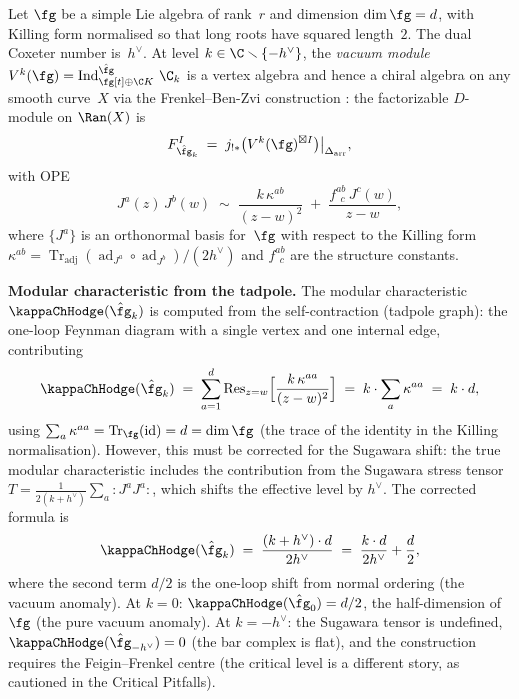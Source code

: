\begin{example}
\label{ex:affine-KM-SC}

Let $\fg$ be a simple Lie algebra of rank~$r$ and dimension
$\dim\fg = d$, with Killing form normalised so that long roots
have squared length~$2$. The dual Coxeter number is~$h^\vee$.
At level $k \in \C \smallsetminus \{-h^\vee\}$, the
\emph{vacuum module} $V^k(\fg) = \operatorname{Ind}_{\fg[t] \oplus
\C K}^{\hat\fg}\, \C_k$ is a vertex algebra and hence a chiral
algebra on any smooth curve~$X$ via the Frenkel--Ben-Zvi
construction \cite{FBZ04}: the factorizable $D$-module on $\Ran(X)$ is
\begin{equation}\label{eq:affine-fact-dmod}
 F_{\hat\fg_k}^I
 \;=\;
 j_{!*}\bigl(V^k(\fg)^{\boxtimes I}\bigr)
 \big|_{\Delta_{\mathrm{arr}}},
\end{equation}
with OPE
\begin{equation}\label{eq:affine-OPE}
 J^a(z)\, J^b(w)
 \;\sim\;
 \frac{k\,\kappa^{ab}}{(z-w)^2}
 \;+\;
 \frac{f^{ab}_{\ \ c}\, J^c(w)}{z-w},
\end{equation}
where $\{J^a\}$ is an orthonormal basis for~$\fg$ with respect to the
Killing form $\kappa^{ab} = \operatorname{Tr}_{\mathrm{adj}}
(\operatorname{ad}_{J^a}\circ\operatorname{ad}_{J^b})/(2h^\vee)$
and $f^{ab}_{\ \ c}$ are the structure constants.

\smallskip\noindent
\textbf{Modular characteristic from the tadpole.}
The modular characteristic $\kappaChHodge(\hat\fg_k)$ is computed from the
self-contraction (tadpole graph): the one-loop Feynman diagram with
a single vertex and one internal edge, contributing
\begin{equation}\label{eq:tadpole-trace}
 \kappaChHodge(\hat\fg_k)
 \;=\;
 \sum_{a=1}^{d} \Res_{z=w}
 \Bigl[\frac{k\,\kappa^{aa}}{(z-w)^2}\Bigr]
 \;=\;
 k \cdot \sum_a \kappa^{aa}
 \;=\;
 k \cdot d,
\end{equation}
using $\sum_a \kappa^{aa} = \operatorname{Tr}_\fg(\id) = d = \dim\fg$
(the trace of the identity in the Killing normalisation). However,
this must be corrected for the Sugawara shift: the true modular
characteristic includes the contribution from the Sugawara stress tensor
$T = \frac{1}{2(k+h^\vee)}\sum_a {:}J^a J^a{:}$, which shifts the
effective level by $h^\vee$. The corrected formula is
\begin{equation}\label{eq:modular-char-affine}
 \kappaChHodge(\hat\fg_k)
 \;=\;
 \frac{(k + h^\vee) \cdot d}{2h^\vee}
 \;=\;
 \frac{k \cdot d}{2h^\vee} + \frac{d}{2},
\end{equation}
where the second term $d/2$ is the one-loop shift from normal
ordering (the vacuum anomaly). At $k = 0$:
$\kappaChHodge(\hat\fg_0) = d/2$, the half-dimension of~$\fg$
(the pure vacuum anomaly). At $k = -h^\vee$: the Sugawara tensor
is undefined, $\kappaChHodge(\hat\fg_{-h^\vee}) = 0$ (the bar complex
is flat), and the construction requires the Feigin--Frenkel
centre (the critical level is a different story, as cautioned in
the Critical Pitfalls).


\end{example}
